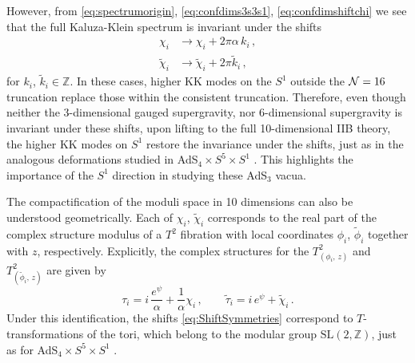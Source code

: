 \documentclass[a4paper, 11pt]{article}
\numberwithin{equation}{section}
\newcommand{\ts}[1]{\widetilde{#1}}
\newcommand{\SL}[1]{\mathrm{SL}( #1 )}
\newcommand{\+}{\oplus}
\newcommand{\EM}[1]{\textcolor{red}{#1}}
\begin{document}
However, from  \eqref{eq:spectrumorigin}, \eqref{eq:confdims3s3s1}, \eqref{eq:confdimshiftchi} we see that the full Kaluza-Klein spectrum is invariant under the shifts
\begin{equation} \label{eq:ShiftSymmetries}
	\begin{split}
		\chi_i &\rightarrow \chi_i + 2\pi\alpha\, k_i\,, \\
		\ts{\chi}_i &\rightarrow \ts{\chi}_i + 2\pi \ts{k}_i \,,
	\end{split}
\end{equation}
for $k_i$, $\ts{k}_i \in \mathbb{Z}$. In these cases, higher KK modes on the $S^1$ outside the ${\cal N}=16$ truncation replace those within the consistent truncation. Therefore, even though neither the 3-dimensional gauged supergravity, nor 6-dimensional supergravity is invariant under these shifts, upon lifting to the full 10-dimensional IIB theory, the higher KK modes on $S^1$ restore the invariance under the shifts, just as in the analogous deformations studied in AdS$_4 \times S^5 \times S^1$ \cite{Giambrone:2021zvp,Giambrone:2021wsm}. This highlights the importance of the $S^1$ direction in studying these AdS$_3$ vacua.


The compactification of the moduli space in 10 dimensions can also be understood geometrically. Each of $\chi_i$, $\ts{\chi}_i$ corresponds to the real part of the complex structure modulus of a $T^2$ fibration with local coordinates $\phi_i$, $\ts{\phi}_i$ together with $z$, respectively. Explicitly, the complex structures for the $T^2_{(\phi_i,\, z)}$ and $T^2_{(\ts{\phi}_i,\, z)}$ are given by
\begin{equation} \label{eq:T2CStructure}
	\tau_i = i\,\frac{e^\psi}{\alpha} + \frac1\alpha \chi_i \,, \qquad \ts{\tau}_i = i\,e^\psi + \ts{\chi}_i \,.
\end{equation}
Under this identification, the shifts \eqref{eq:ShiftSymmetries} correspond to $T$-transformations of the tori, which belong to the modular group $\SL{2,\mathbb{Z}}$, just as for AdS$_4 \times S^5 \times S^1$ \cite{Giambrone:2021zvp,Giambrone:2021wsm}.
\end{document}
